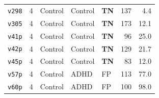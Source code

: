 \begin{longtable}{lclllrr}
  \texttt{v298} & 4 & Control & Control & \textbf{TN} & 137 & 4.4 \\
  \texttt{v305} & 4 & Control & Control & \textbf{TN} & 173 & 12.1 \\
  \texttt{v41p} & 4 & Control & Control & \textbf{TN} & 96 & 25.0 \\
  \texttt{v42p} & 4 & Control & Control & \textbf{TN} & 129 & 21.7 \\
  \texttt{v45p} & 4 & Control & Control & \textbf{TN} & 83 & 12.0 \\
  \texttt{v57p} & 4 & Control & ADHD & FP & 113 & 77.0 \\
  \texttt{v60p} & 4 & Control & ADHD & FP & 100 & 98.0 \\
\end{longtable}
